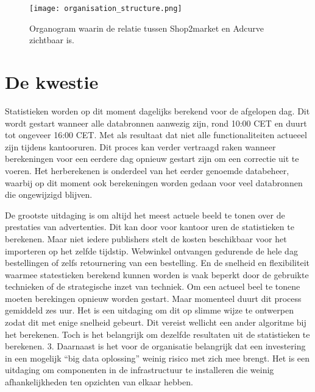 \begin{figure}[h]
    \texttt{[image: organisation\_structure.png]}
    \caption{Organogram waarin de relatie tussen Shop2market en Adcurve zichtbaar is.}
    \label{fig:orgchart}
\end{figure}

\section{De kwestie} %

Statistieken worden op dit moment dagelijks berekend voor de afgelopen dag. Dit wordt gestart wanneer alle databronnen aanwezig zijn, rond 10:00 CET en duurt tot ongeveer 16:00 CET. Met als resultaat dat niet alle functionaliteiten actueeel zijn tijdens kantooruren. Dit proces kan verder vertraagd raken wanneer berekeningen voor een eerdere dag opnieuw gestart zijn om een correctie uit te voeren. Het herberekenen is onderdeel van het eerder genoemde databeheer, waarbij op dit moment ook berekeningen worden gedaan voor veel databronnen die ongewijzigd blijven.

De grootste uitdaging is om altijd het meest actuele beeld te tonen over de prestaties van advertenties. Dit kan door voor kantoor uren de statistieken te berekenen. Maar niet iedere publishers stelt de kosten beschikbaar voor het importeren op het zelfde tijdstip. Webwinkel ontvangen gedurende de hele dag bestellingen of zelfs retournering van een bestelling. En de snelheid en flexibiliteit waarmee statestieken berekend kunnen worden is vaak beperkt door de gebruikte technieken of de strategische inzet van techniek. Om een actueel beel te tonene moeten berekingen opnieuw worden gestart. Maar momenteel duurt dit process gemiddeld zes uur. Het is een uitdaging om dit op slimme wijze te ontwerpen zodat dit met enige snelheid gebeurt. Dit vereist wellicht een ander algoritme bij het berekenen. Toch is het belangrijk om dezelfde resultaten uit de statistieken te berekenen.
3.	Daarnaast is het voor de organisatie belangrijk dat een investering in een mogelijk “big data oplossing” weinig risico met zich mee brengt. Het is een uitdaging om componenten in de infrastructuur te installeren die weinig afhankelijkheden ten opzichten van elkaar hebben.



